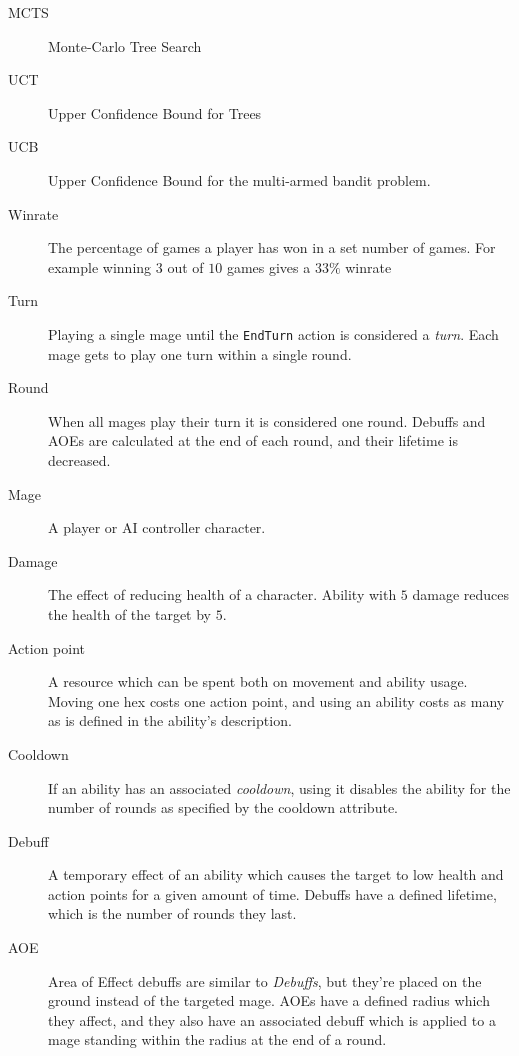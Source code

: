
\begin{description}
	\item[MCTS] Monte-Carlo Tree Search
	\item[UCT] Upper Confidence Bound for Trees
	\item[UCB] Upper Confidence Bound for the multi-armed bandit problem.
	
	\item[Winrate] The percentage of games a player has won in a set number of games. For example winning $3$ out of $10$ games gives a $33\%$ winrate
	
	\item[Turn] Playing a single mage until the \verb|EndTurn| action is considered a \emph{turn}. Each mage gets to play one turn within a single round.
	
	\item[Round] When all mages play their turn it is considered one round. Debuffs and AOEs are calculated at the end of each round, and their lifetime is decreased.
	
	\item[Mage] A player or AI controller character.
	
	\item[Damage] The effect of reducing health of a character. Ability with $5$ damage reduces the health of the target by $5$.
	
	\item[Action point] A resource which can be spent both on movement and ability usage. Moving one hex costs one action point, and using an ability costs as many as is defined in the ability's description.
	
	\item[Cooldown] If an ability has an associated \emph{cooldown}, using it disables the ability for the number of rounds as specified by the cooldown attribute.

	\item[Debuff] A temporary effect of an ability which causes the target to low health and action points for a given amount of time. Debuffs have a defined lifetime, which is the number of rounds they last.
	
	\item[AOE] Area of Effect debuffs are similar to \emph{Debuffs}, but they're placed on the ground instead of the targeted mage. AOEs have a defined radius which they affect, and they also have an associated debuff which is applied to a mage standing within the radius at the end of a round.
\end{description}